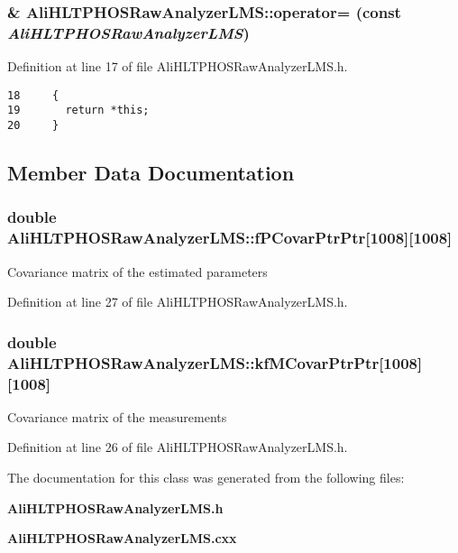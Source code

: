 \subsubsection{\& Ali\-HLTPHOSRaw\-Analyzer\-LMS::operator= (const  {\em Ali\-HLTPHOSRaw\-Analyzer\-LMS})\hspace{0.3cm}{\tt  [inline]}}\label{classAliHLTPHOSRawAnalyzerLMS_a3}




Definition at line 17 of file Ali\-HLTPHOSRaw\-Analyzer\-LMS.h.

\footnotesize\begin{verbatim}18     {
19       return *this; 
20     }
\end{verbatim}\normalsize 




\subsection{Member Data Documentation}
\subsubsection{\setlength{\rightskip}{0pt plus 5cm}double {\bf Ali\-HLTPHOSRaw\-Analyzer\-LMS::f\-PCovar\-Ptr\-Ptr}[1008][1008]\hspace{0.3cm}{\tt  [private]}}\label{classAliHLTPHOSRawAnalyzerLMS_r1}


Covariance matrix of the estimated parameters 

Definition at line 27 of file Ali\-HLTPHOSRaw\-Analyzer\-LMS.h.
\subsubsection{\setlength{\rightskip}{0pt plus 5cm}double {\bf Ali\-HLTPHOSRaw\-Analyzer\-LMS::kf\-MCovar\-Ptr\-Ptr}[1008][1008]\hspace{0.3cm}{\tt  [private]}}\label{classAliHLTPHOSRawAnalyzerLMS_r0}


Covariance matrix of the measurements 

Definition at line 26 of file Ali\-HLTPHOSRaw\-Analyzer\-LMS.h.

The documentation for this class was generated from the following files:\begin{CompactItemize}
\item 
{\bf Ali\-HLTPHOSRaw\-Analyzer\-LMS.h}\item 
{\bf Ali\-HLTPHOSRaw\-Analyzer\-LMS.cxx}\end{CompactItemize}
